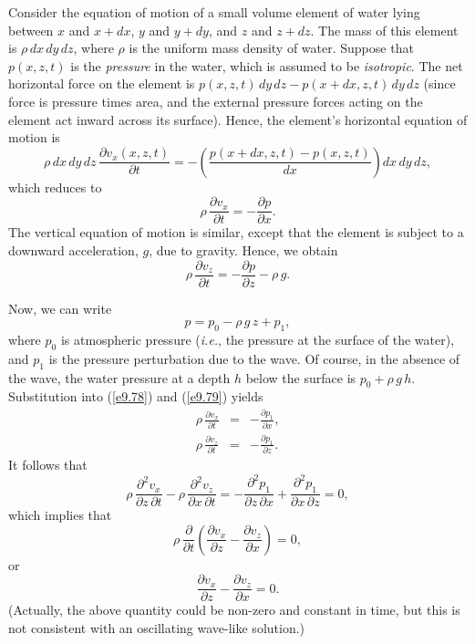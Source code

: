Consider the equation of motion of a small volume element of water  lying between $x$ and $x+dx$, $y$ and $y+dy$, and $z$ and $z+dz$. The mass of this element is
$\rho\,dx\,dy\,dz$, where $\rho$ is the uniform mass density of water. Suppose
that $p(x,z,t)$ is the {\em pressure}\/ in the water, which is assumed to be {\em isotropic}. 
The net horizontal force on the element is $p(x,z,t)\,dy\,dz -
 p(x+dx,z,t)\,dy\,dz$ (since force is pressure times area, and the external pressure forces
 acting on the element act inward across its surface). Hence, the element's horizontal equation of motion is
 \begin{equation}
 \rho\,dx\,dy\,dz\,\frac{\partial v_x(x,z,t)}{\partial t} = -\left(\frac{p(x+dx,z,t)-p(x,z,t)}{dx}\right)dx\,dy\,dz,
 \end{equation}
 which reduces to
 \begin{equation}\label{e9.78}
 \rho\,\frac{\partial v_x}{\partial t} = - \frac{\partial p}{\partial x}.
 \end{equation}
 The vertical equation of motion is similar, except that the element is subject to
 a downward acceleration, $g$, due to gravity. Hence, we obtain
 \begin{equation}\label{e9.79}
 \rho\,\frac{\partial v_z}{\partial t} = -\frac{\partial p}{\partial z} - \rho\,g.
 \end{equation}
 
 Now, we can write
 \begin{equation}\label{e9.80}
 p = p_0-\rho\,g\,z+p_1,
 \end{equation}
 where $p_0$ is atmospheric pressure ({\em i.e.}, the pressure at the surface of the water), and $p_1$ is the pressure perturbation due to the wave. Of course, in the absence of
 the wave, the water pressure at a depth $h$ below the surface is $p_0+\rho\,g\,h$. 
 Substitution into (\ref{e9.78}) and (\ref{e9.79}) yields
 \begin{eqnarray}\label{e9.81}
 \rho\,\frac{\partial v_x}{\partial t}& =& - \frac{\partial p_1}{\partial x},\\[0.5ex]
  \rho\,\frac{\partial v_z}{\partial t}& =& - \frac{\partial p_1}{\partial z}.\label{e9.82}
  \end{eqnarray}
  It follows that
  \begin{equation}
  \rho\,\frac{\partial^2 v_x}{\partial z\,\partial t} -\rho\,\frac{\partial^2 v_z}{\partial x\,\partial t} = -\frac{\partial^2 p_1}{\partial z\,\partial x} + \frac{\partial^2 p_1}{\partial x\,\partial z} = 0,
  \end{equation}
  which implies that
  \begin{equation}
  \rho\,\frac{\partial}{\partial t}\!\left(\frac{\partial v_x}{\partial z} -\frac{\partial v_z}{\partial x}\right) = 0,
  \end{equation}
  or
  \begin{equation}\label{e9.84}
  \frac{\partial v_x}{\partial z} -\frac{\partial v_z}{\partial x} = 0.
  \end{equation}
  (Actually, the above quantity could be non-zero and constant in time, but this is
  not consistent with an oscillating wave-like solution.)
  
